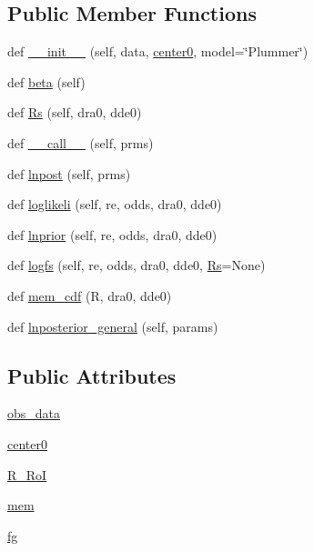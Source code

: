 \subsection*{Public Member Functions}
\begin{DoxyCompactItemize}
\item 
def \hyperlink{classmodki17_1_1modKI17__photometry_ac6b74b27fd17bb8e7353d00bfd007ec1}{\+\_\+\+\_\+init\+\_\+\+\_\+} (self, data, \hyperlink{classmodki17_1_1modKI17__photometry_a5af79ede8fed3e9d7b3ba809c84a06e1}{center0}, model=\char`\"{}Plummer\char`\"{})
\item 
def \hyperlink{classmodki17_1_1modKI17__photometry_a7038c9a4666ac8568838f51f9a4d9c21}{beta} (self)
\item 
def \hyperlink{classmodki17_1_1modKI17__photometry_aebe66d2f7557c9143c8d636468400837}{Rs} (self, dra0, dde0)
\item 
def \hyperlink{classmodki17_1_1modKI17__photometry_a8161b90b7f4ae01225328c840512f1f5}{\+\_\+\+\_\+call\+\_\+\+\_\+} (self, prms)
\item 
def \hyperlink{classmodki17_1_1modKI17__photometry_a9686c3f863cf13041edca94fbf62a157}{lnpost} (self, prms)
\item 
def \hyperlink{classmodki17_1_1modKI17__photometry_a1c7a3d4028e066698b0b379ba46f61d6}{loglikeli} (self, re, odds, dra0, dde0)
\item 
def \hyperlink{classmodki17_1_1modKI17__photometry_a857286f3245038e653c739b35c4988e8}{lnprior} (self, re, odds, dra0, dde0)
\item 
def \hyperlink{classmodki17_1_1modKI17__photometry_a2d4b3707792c8c224068ad6715d42545}{logfs} (self, re, odds, dra0, dde0, \hyperlink{classmodki17_1_1modKI17__photometry_aebe66d2f7557c9143c8d636468400837}{Rs}=None)
\item 
def \hyperlink{classmodki17_1_1modKI17__photometry_ae1dc87c123abbd71228d68b964469937}{mem\+\_\+cdf} (R, dra0, dde0)
\item 
def \hyperlink{classmodki17_1_1modKI17__photometry_ad1288aa45a1823113ff486133a5f7fa9}{lnposterior\+\_\+general} (self, params)
\end{DoxyCompactItemize}
\subsection*{Public Attributes}
\begin{DoxyCompactItemize}
\item 
\hyperlink{classmodki17_1_1modKI17__photometry_a78af1109146376d0e7e3310d2e49e957}{obs\+\_\+data}
\item 
\hyperlink{classmodki17_1_1modKI17__photometry_a5af79ede8fed3e9d7b3ba809c84a06e1}{center0}
\item 
\hyperlink{classmodki17_1_1modKI17__photometry_ad5606769c34da346fe8bc9d8d79ed0e5}{R\+\_\+\+RoI}
\item 
\hyperlink{classmodki17_1_1modKI17__photometry_a335237630ae300e82ccf6fd17be75070}{mem}
\item 
\hyperlink{classmodki17_1_1modKI17__photometry_ab5d7bda77297a71c86ac83b9159167bf}{fg}
\end{DoxyCompactItemize}
